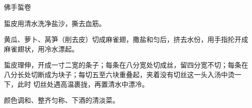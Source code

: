 \begin{recipe}{佛手蜇卷}

\ingredients


\preparation

\step 蜇皮用清水洗净盐沙，撕去血筋。

\step 黄瓜、萝卜、莴笋（削去皮）切成麻雀翅，撒盐和匀后，挤去水份，用手指抡开成
麻雀翅状，用冷水漂起。

\step 蜇皮理伸，开成一寸二宽的条子；每条在八分宽处切成丝，留四分宽不切；每条在
八分长处切断成为块子；每切五至六块重叠起，夹着没有切丝这一头入汤中烫一下，此时
切丝处遇高温裹拢，再置清水中漂冷。

\features

颜色调和、整齐匀称、下酒的清淡菜。

\end{recipe}

